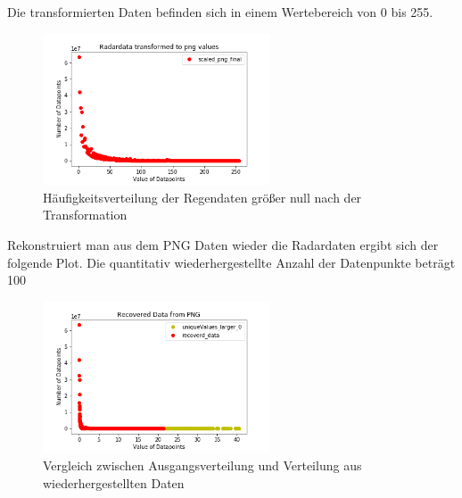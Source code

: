 Die transformierten Daten befinden sich in einem Wertebereich von 0 bis 255.

\begin{figure}[h]
 \centering
 \includegraphics[width=0.6\textwidth,angle=0]{abb/Radardatapoints_of_June_2016_TransformedToPNG}
 \caption[Datenaufbereitung]{Häufigkeitsverteilung der Regendaten größer null nach der Transformation}
\label{fig:datenaufbereitung}
\end{figure}

Rekonstruiert man aus dem PNG Daten wieder die Radardaten ergibt sich der folgende Plot. Die quantitativ wiederhergestellte Anzahl der Datenpunkte beträgt 100%

\begin{figure}[h]
 \centering
 \includegraphics[width=0.6\textwidth,angle=0]{abb/Radardatapoints_of_June_2016_RecoveredData}
 \caption[Datenaufbereitung]{Vergleich zwischen Ausgangsverteilung und Verteilung aus wiederhergestellten Daten}
\label{fig:datenaufbereitung}
\end{figure}
